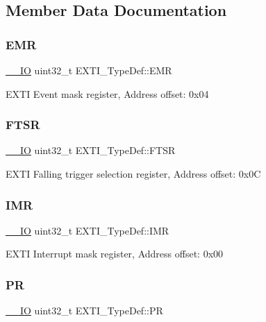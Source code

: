 \subsection{Member Data Documentation}
\mbox{\label{struct_e_x_t_i___type_def_a9c5bff67bf9499933959df7eb91a1bd6}} 
\subsubsection{\texorpdfstring{EMR}{EMR}}
{\footnotesize\ttfamily \mbox{\hyperlink{core__sc300_8h_aec43007d9998a0a0e01faede4133d6be}{\+\_\+\+\_\+\+IO}} uint32\+\_\+t E\+X\+T\+I\+\_\+\+Type\+Def\+::\+E\+MR}

E\+X\+TI Event mask register, Address offset\+: 0x04 \mbox{\label{struct_e_x_t_i___type_def_aee667dc148250bbf37fdc66dc4a9874d}} 
\subsubsection{\texorpdfstring{FTSR}{FTSR}}
{\footnotesize\ttfamily \mbox{\hyperlink{core__sc300_8h_aec43007d9998a0a0e01faede4133d6be}{\+\_\+\+\_\+\+IO}} uint32\+\_\+t E\+X\+T\+I\+\_\+\+Type\+Def\+::\+F\+T\+SR}

E\+X\+TI Falling trigger selection register, Address offset\+: 0x0C \mbox{\label{struct_e_x_t_i___type_def_a17d061db586d4a5aa646b68495a8e6a4}} 
\subsubsection{\texorpdfstring{IMR}{IMR}}
{\footnotesize\ttfamily \mbox{\hyperlink{core__sc300_8h_aec43007d9998a0a0e01faede4133d6be}{\+\_\+\+\_\+\+IO}} uint32\+\_\+t E\+X\+T\+I\+\_\+\+Type\+Def\+::\+I\+MR}

E\+X\+TI Interrupt mask register, Address offset\+: 0x00 \mbox{\label{struct_e_x_t_i___type_def_a133294b87dbe6a01e8d9584338abc39a}} 
\subsubsection{\texorpdfstring{PR}{PR}}
{\footnotesize\ttfamily \mbox{\hyperlink{core__sc300_8h_aec43007d9998a0a0e01faede4133d6be}{\+\_\+\+\_\+\+IO}} uint32\+\_\+t E\+X\+T\+I\+\_\+\+Type\+Def\+::\+PR}

